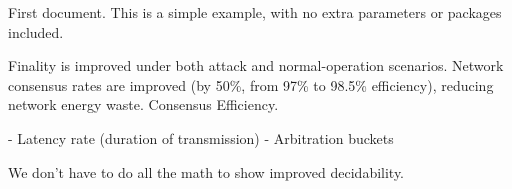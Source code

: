 \documentclass{article}
\begin{document}
First document. This is a simple example, with no 
extra parameters or packages included.


Finality is improved under both attack and normal-operation scenarios.
Network consensus rates are improved (by 50\%, from 97\% to 98.5\% efficiency), reducing network energy waste. Consensus Efficiency.

- Latency rate (duration of transmission)
- Arbitration buckets

We don't have to do all the math to show improved decidability.
\end{document}

